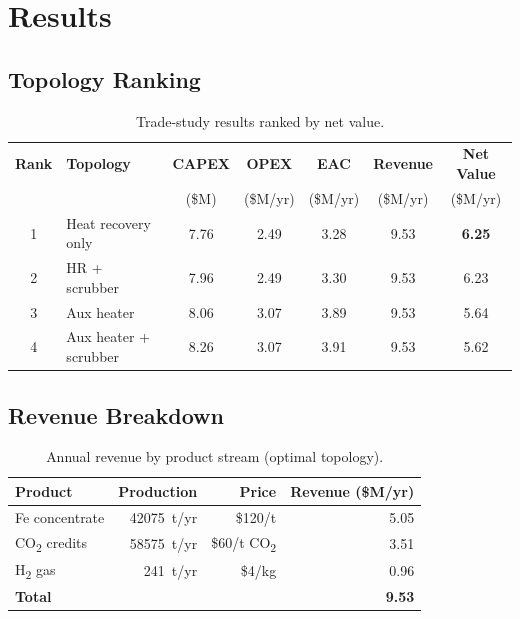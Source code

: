 \documentclass[11pt,a4paper]{article}
\begin{document}
\section{Results}

\subsection{Topology Ranking}

\begin{table}[H]
\centering
\caption{Trade-study results ranked by net value.}
\label{tab:tradeStudy}
\begin{tabular}{@{}clccccc@{}}
\toprule
\textbf{Rank} & \textbf{Topology} & \textbf{CAPEX} & \textbf{OPEX}
  & \textbf{EAC} & \textbf{Revenue} & \textbf{Net Value} \\
& & (\$M) & (\$M/yr) & (\$M/yr) & (\$M/yr) & (\$M/yr) \\
\midrule
1 & Heat recovery only        & 7.76 & 2.49 & 3.28 & 9.53 & \textbf{6.25} \\
2 & HR + scrubber             & 7.96 & 2.49 & 3.30 & 9.53 & 6.23 \\
3 & Aux heater                & 8.06 & 3.07 & 3.89 & 9.53 & 5.64 \\
4 & Aux heater + scrubber     & 8.26 & 3.07 & 3.91 & 9.53 & 5.62 \\
\bottomrule
\end{tabular}
\end{table}

\subsection{Revenue Breakdown}

\begin{table}[H]
\centering
\caption{Annual revenue by product stream (optimal topology).}
\label{tab:revenue}
\begin{tabular}{@{}lrrr@{}}
\toprule
\textbf{Product} & \textbf{Production} & \textbf{Price} & \textbf{Revenue (\$M/yr)} \\
\midrule
Fe concentrate  & \SI{42075}{t/yr}  & \$120/t  & 5.05 \\
CO\textsubscript{2} credits & \SI{58575}{t/yr} & \$60/t CO\textsubscript{2} & 3.51 \\
H\textsubscript{2} gas & \SI{241}{t/yr} & \$4/kg & 0.96 \\
\midrule
\textbf{Total}  & & & \textbf{9.53} \\
\bottomrule
\end{tabular}
\end{table}
\end{document}
